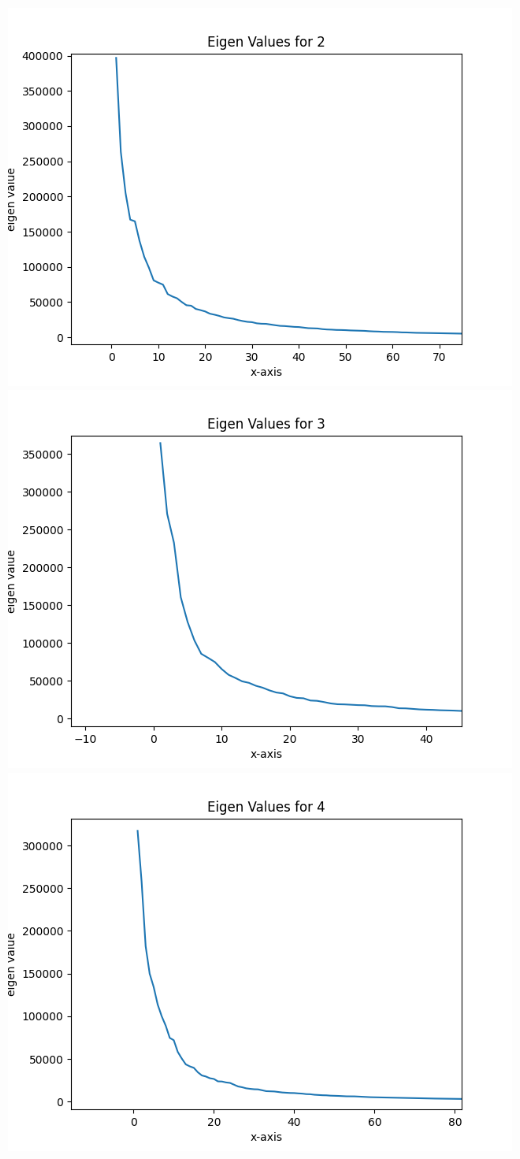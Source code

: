 \documentclass{article}
\begin{document}
    \\
    \includegraphics[scale=.5]{../results/q4/eigen_plots/2_eigen_value.png}
    \includegraphics[scale=.5]{../results/q4/eigen_plots/3_eigen_value.png}
    \\
    \includegraphics[scale=.5]{../results/q4/eigen_plots/4_eigen_value.png}
\end{document}
